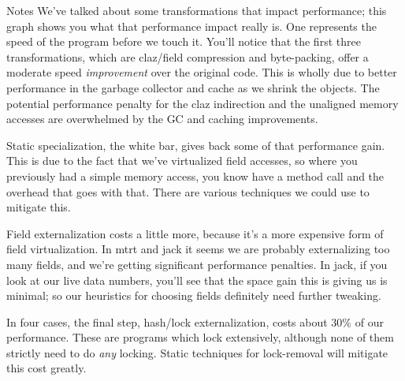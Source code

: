 \documentclass[%
pdf,
colorBG,
slideColor,
nototal,
oqe
]{prosper}
\newenvironment{talknotes}{\begin{slide}{Notes}\tiny}{\end{slide}}
\begin{document}
\begin{talknotes}
We've talked about some transformations that impact performance;
this graph shows you what that performance impact really is.
One represents the speed of the program before we touch it.
You'll notice that the first three transformations, which are
claz/field compression and byte-packing, offer a moderate speed
\emph{improvement} over the original code.  This is wholly due to
better performance in the garbage collector and cache as we shrink the
objects.  The potential performance penalty for the claz indirection
and the unaligned memory accesses are overwhelmed by the GC and caching
improvements.

Static specialization, the white bar, gives back some of that
performance gain.  This is due to the fact that we've virtualized
field accesses, so where you previously had a simple memory access,
you know have a method call and the overhead that goes with that.
There are various techniques we could use to mitigate this.

Field externalization costs a little more, because it's a more
expensive form of field virtualization.  In mtrt and jack it seems we
are probably externalizing too many fields, and we're getting
significant performance penalties.  In jack, if you look at our live
data numbers, you'll see that the space gain this is giving us is
minimal; so our heuristics for choosing fields definitely need further
tweaking.

In four cases, the final step, hash/lock externalization, costs about
30\% of our performance.  These are programs which lock extensively,
although none of them strictly need to do \emph{any} locking.
Static techniques for lock-removal will mitigate this cost greatly.

~%
\end{talknotes}
\end{document}
